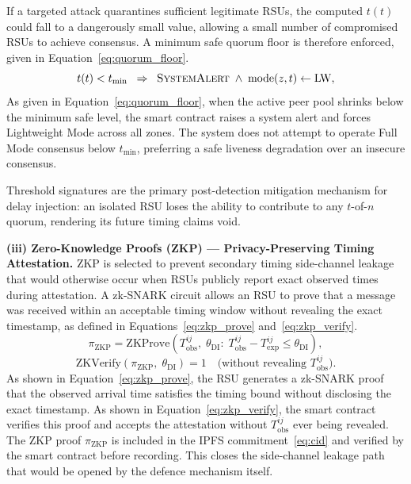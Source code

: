 If a targeted attack quarantines sufficient legitimate RSUs, the
computed $t(t)$ could fall to a dangerously small value, allowing
a small number of compromised RSUs to achieve consensus. A minimum
safe quorum floor is therefore enforced, given in
Equation~\eqref{eq:quorum_floor}.
%
\begin{equation}
  t(t) < t_{\min}
  \;\;\Rightarrow\;\;
  \textsc{SystemAlert}\;\wedge\;
  \mathrm{mode}(z,t) \leftarrow \mathrm{LW},
  \label{eq:quorum_floor}
\end{equation}
%
As given in Equation~\eqref{eq:quorum_floor}, when the active peer
pool shrinks below the minimum safe level, the smart contract
raises a system alert and forces Lightweight Mode across all
zones. The system does not attempt to operate Full Mode consensus
below $t_{\min}$, preferring a safe liveness degradation over an
insecure consensus.

Threshold
signatures are the primary post-detection mitigation mechanism for
delay injection: an isolated RSU loses the ability to contribute to
any $t$-of-$n$ quorum, rendering its future timing claims void.

\textbf{(iii) Zero-Knowledge Proofs (ZKP) — Privacy-Preserving Timing Attestation.}
ZKP is selected to prevent secondary timing side-channel leakage
that would otherwise occur when RSUs publicly report exact observed
times during attestation. A zk-SNARK circuit allows an RSU to prove that a message was
received within an acceptable timing window without revealing
the exact timestamp, as defined in Equations~\eqref{eq:zkp_prove}
and~\eqref{eq:zkp_verify}.
\begin{equation}
\pi_{\mathrm{ZKP}} = \mathrm{ZKProve}\!\left(
  T_{\mathrm{obs}}^{ij},\;\theta_{\mathrm{DI}}:\;
  T_{\mathrm{obs}}^{ij} - T_{\mathrm{exp}}^{ij}
  \leq \theta_{\mathrm{DI}}
\right),
\label{eq:zkp_prove}
\end{equation}
\begin{equation}
\mathrm{ZKVerify}\!\left(
  \pi_{\mathrm{ZKP}},\;\theta_{\mathrm{DI}}
\right) = 1
\quad\text{(without revealing }T_{\mathrm{obs}}^{ij}\text{)}.
\label{eq:zkp_verify}
\end{equation}
As shown in Equation~\eqref{eq:zkp_prove}, the RSU generates
a zk-SNARK proof that the observed arrival time satisfies the
timing bound without disclosing the exact timestamp. As shown
in Equation~\eqref{eq:zkp_verify}, the smart contract verifies
this proof and accepts the attestation without
$T_{\mathrm{obs}}^{ij}$ ever being revealed. The ZKP proof
$\pi_{\mathrm{ZKP}}$ is included in the IPFS
commitment~\eqref{eq:cid} and verified by the smart contract
before recording. This closes the side-channel leakage path that
would be opened by the defence mechanism itself.


